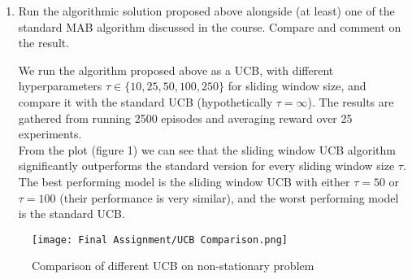 \documentclass{article}
\begin{document}
\begin{enumerate}
\item{Run the algorithmic solution proposed above alongside (at least) one of the standard MAB algorithm discussed in the course. Compare and comment on the result.}

We run the algorithm proposed above as a UCB, with different hyperparameters $\tau \in \{10, 25, 50, 100, 250\}$ for sliding window size, and compare it with the standard UCB (hypothetically $\tau = \infty$). The results are gathered from running 2500 episodes and averaging reward over 25 experiments.
\\[10pt]
From the plot (figure 1) we can see that the sliding window UCB algorithm significantly outperforms the standard version for every sliding window size $\tau$. The best performing model is the sliding window UCB with either $\tau = 50$ or $\tau = 100$ (their performance is very similar), and the worst performing model is the standard UCB.

\end{enumerate}

\begin{figure}
    \centering
    \texttt{[image: Final Assignment/UCB Comparison.png]}
    \caption{Comparison of different UCB on non-stationary problem}
\end{figure}
\end{document}
